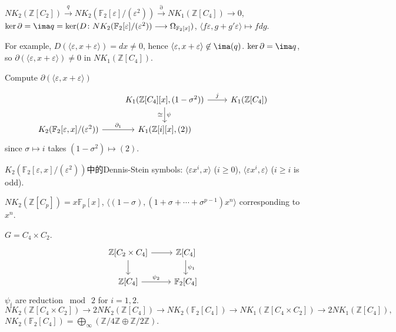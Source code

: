 $NK_2(\mathbb{Z}[C_2])\overset{q}\longrightarrow NK_2(\mathbb{F}_{2}[\varepsilon]/(\varepsilon^2))\overset{\partial}\longrightarrow NK_1(\mathbb{Z}[C_4])\longrightarrow 0$,\\
 $\ker \partial =\ima q =\ker (D\colon NK_2(\mathbb{F}_{2}[\varepsilon]/(\varepsilon^2))\longrightarrow \Omega_{\mathbb{F}_{2}[x]})$, $\langle f\varepsilon,g+g'\varepsilon\rangle \mapsto f dg$.

For example, $D(\langle \varepsilon,x+\varepsilon\rangle)=d x\neq 0$, hence $\langle \varepsilon,x+\varepsilon\rangle \not\in \ima(q)$. $\ker \partial=\ima q$, so $\partial (\langle \varepsilon,x+\varepsilon\rangle)\neq 0$ in $NK_1(\mathbb{Z}[C_4])$.

Compute $\partial (\langle \varepsilon,x+\varepsilon\rangle)$

\[
\begin{tikzcd}
		& K_1(\mathbb{Z}[C_4][x],(1-\sigma^2)) \ar[r,"j"] \ar[d,"\psi","\cong"']& K_1(\mathbb{Z}[C_4])\\
	K_2(\mathbb{F}_{2}[\varepsilon,x]/(\varepsilon^2)) \ar[r,"\partial_1"] & K_1(\mathbb{Z}[i][x],(2))
\end{tikzcd}
\]
since $\sigma\mapsto i$ takes $(1-\sigma^2)\mapsto (2)$.

$K_2(\mathbb{F}_{2}[\varepsilon,x]/(\varepsilon^2))$中的Dennis-Stein symbols: $\langle \varepsilon x^i,x\rangle$ ($i\geq 0$), $\langle \varepsilon x^i,\varepsilon \rangle$ ($i\geq i$ is odd).

$NK_2(\mathbb{Z}[C_p])=x\mathbb{F}_{p}[x]$, $\langle (1-\sigma),(1+\sigma+\cdots+\sigma^{p-1})x^n\rangle$ corresponding to $x^n$.




$G=C_4\times C_2$.
\[\begin{tikzcd}
			\mathbb{Z}[C_2\times C_4] \ar[r] \ar[d]& \mathbb{Z}[C_4]\ar[d,"\psi_1"]\\
			\mathbb{Z}[C_4] \ar[r,"\psi_2"] & \mathbb{F}_2[C_4]
		\end{tikzcd}\]
$\psi_i$ are reduction $\bmod\ 2$ for $i=1,2$.
\[NK_2(\mathbb{Z}[C_4\times C_2])\longrightarrow 2NK_2(\mathbb{Z}[C_4])\longrightarrow NK_2(\mathbb{F}_2[C_4])\longrightarrow NK_1(\mathbb{Z}[C_4\times C_2])\longrightarrow 2NK_1(\mathbb{Z}[C_4]),\]
$NK_2(\mathbb{F}_2[C_4])=\bigoplus_{\infty}(\mathbb{Z}/4 \mathbb{Z}\oplus \mathbb{Z}/2 \mathbb{Z})$.











